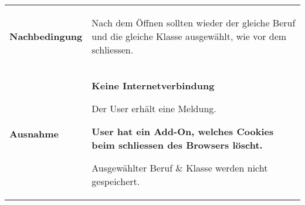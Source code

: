 \documentclass[11pt,a4paper,titlepage,portrait,ngerman,final]{scrartcl}
\begin{document}
\begin{tabular}{|p{}||p{}|}
{} \\ 
\hline \rule[-2ex]{0pt}{5.5ex} \textbf{Nachbedingung} & {
	\begin{list}{\textendash}{\vspace{-5mm}}
		\item{Nach dem Öffnen sollten wieder der gleiche Beruf und die gleiche Klasse ausgewählt, wie vor dem schliessen.}
	\end{list}
}  \\
\hline \rule[-2ex]{0pt}{5.5ex} \textbf{Ausnahme} & {
	\begin{list}{\textendash}{\vspace{-5mm}}
		\item{
			\textbf{Keine Internetverbindung}
			
			Der User erhält eine Meldung.
		}
		\item{
			\textbf{User hat ein Add-On, welches Cookies beim schliessen des Browsers löscht.}
			
			Ausgewählter Beruf \& Klasse werden nicht gespeichert.
		}
	\end{list}
}  \\
\hline 
\end{tabular}
\end{document}

